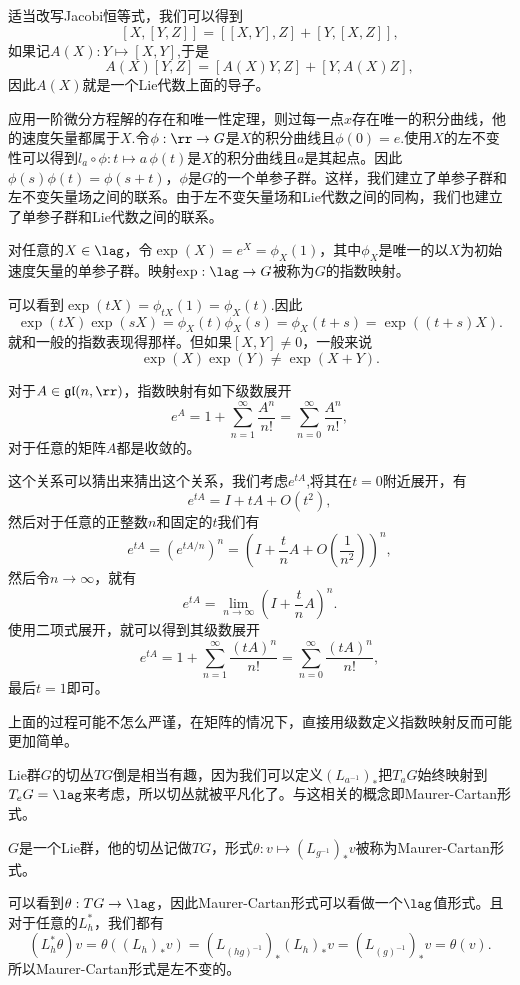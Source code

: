 适当改写Jacobi恒等式，我们可以得到
\[
[X,[Y,Z]]=[[X,Y],Z]+[Y,[X,Z]],
\]
如果记$A(X):Y\mapsto [X,Y]$,于是
\[
A(X)[Y,Z]=[A(X)Y,Z]+[Y,A(X)Z],
\]
因此$A(X)$就是一个Lie代数上面的导子。

应用一阶微分方程解的存在和唯一性定理，则过每一点$x$存在唯一的积分曲线，他的速度矢量都属于$X$.令$\phi:\rr\to G$是$X$的积分曲线且$\phi(0)=e$.使用$X$的左不变性可以得到$l_a\circ \phi:t\mapsto a\,\phi(t)$是$X$的积分曲线且$a$是其起点。因此$
\phi(s)\phi(t)=\phi(s+t)$，$\phi$是$G$的一个单参子群。这样，我们建立了单参子群和左不变矢量场之间的联系。由于左不变矢量场和Lie代数之间的同构，我们也建立了单参子群和Lie代数之间的联系。

\begin{defi}
对任意的$X\in \lag$，令$\exp(X)=e^X=\phi_X(1)$，其中$\phi_X$是唯一的以$X$为初始速度矢量的单参子群。映射$\exp:\lag\to G$被称为$G$的指数映射。
\end{defi}
可以看到$\exp(tX)=\phi_{tX}(1)=\phi_{X}(t)$.因此
\[
\exp(tX)\exp(sX)=\phi_{X}(t)\phi_{X}(s)=\phi_{X}(t+s)=\exp((t+s)X).
\]
就和一般的指数表现得那样。但如果$[X,Y]\neq 0$，一般来说\[
\exp(X)\exp(Y)\neq \exp(X+Y).
\]

\begin{theo}
对于$A\in\mathfrak{gl}(n,\rr)$，指数映射有如下级数展开
\[
	e^A=1+\sum_{n=1}^\infty \frac{A^n}{n!}=\sum_{n=0}^\infty \frac{A^n}{n!},
\]
对于任意的矩阵$A$都是收敛的。
\end{theo}

这个关系可以猜出来猜出这个关系，我们考虑$e^{tA}$,将其在$t=0$附近展开，有
\[
e^{tA}=I+tA+O(t^2),
\]
然后对于任意的正整数$n$和固定的$t$我们有
\[
e^{tA}=\left(e^{tA/n}\right)^n=\left(I+\frac{t}{n}A+O\left(\frac{1}{n^2}\right)\right)^n,
\]
然后令$n\to\infty$，就有
\[
e^{tA}=\lim_{n\to\infty}\left(I+\frac{t}{n}A\right)^n.
\]
使用二项式展开，就可以得到其级数展开
\[
	e^{tA}=1+\sum_{n=1}^\infty \frac{(tA)^n}{n!}=\sum_{n=0}^\infty \frac{(tA)^n}{n!},
\]
最后$t=1$即可。

上面的过程可能不怎么严谨，在矩阵的情况下，直接用级数定义指数映射反而可能更加简单。

Lie群$G$的切丛$TG$倒是相当有趣，因为我们可以定义$(L_{a^{-1}})_*$把$T_aG$始终映射到$T_eG=\lag$来考虑，所以切丛就被平凡化了。与这相关的概念即Maurer-Cartan形式。
\begin{defi}
$G$是一个Lie群，他的切丛记做$TG$，形式$\theta:v\mapsto (L_{g^{-1}})_*v$被称为Maurer-Cartan形式。
\end{defi}
可以看到$\theta:TG\to \lag$，因此Maurer-Cartan形式可以看做一个$\lag$值形式。且对于任意的$L_h^*$，我们都有
\[
(L_h^*\theta)v=\theta((L_h)_*v)=(L_{(hg)^{-1}})_*(L_h)_*v=(L_{(g)^{-1}})_*v=\theta(v).
\]
所以Maurer-Cartan形式是左不变的。

